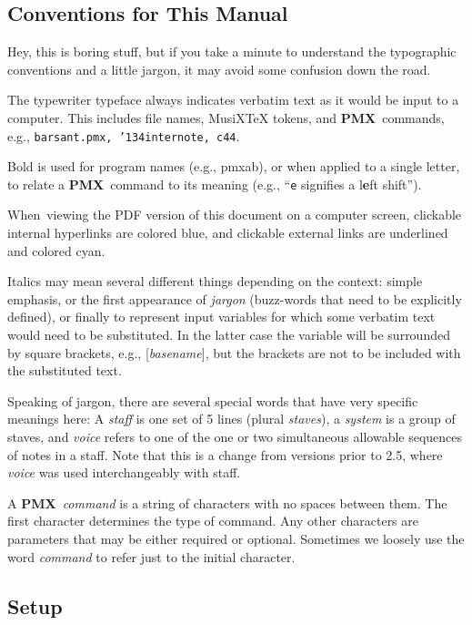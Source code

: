 \documentclass[11pt]{article}
\def\MusiXTeX{MusiX\TeX}
\def\bs{{\tt\char'134}}
\newcommand\PMXX{\textbf{PMX}}
\newcommand\PMX{\PMXX~}
\def\newfrom{2.59}  %
\def\NEW#1{\ifdim#1 pt<\newfrom pt\else%
\marginpar{\fbox{#1}}\fi}
\begin{document}
\subsection{Conventions for This Manual}

	Hey, this is boring stuff, but if you take a minute to understand
the typographic conventions and a little jargon, 
it may avoid some confusion down the road.

	The typewriter typeface always indicates verbatim text as it would
be input to a computer.  This includes file names, \MusiXTeX{} tokens, and 
\PMX commands, e.g., {\tt barsant.pmx, \bs internote, c44}. 

	Bold is used for program names (e.g., {\bfx pmxab}), or when applied
to a single letter, to relate a \PMX command to its meaning (e.g., ``{\tt e}
signifies a l{\bf e}ft shift'').

        When\NEW{2.5}~viewing the PDF version of this document on a computer 
screen, clickable internal hyperlinks are colored blue, and clickable external 
links are underlined and colored cyan. 

        Italics may mean several different things depending on the context:
simple emphasis, or the first appearance of {\it jargon} 
(buzz-words that need to be explicitly defined), or finally  
to represent input variables for which some verbatim text would need to be 
substituted.  In the latter case the variable will be surrounded by
square brackets, e.g., [{\it basename}], but the brackets are not to be 
included with the substituted text.

        Speaking of jargon, there are several special words that have very 
specific meanings here: A {\it staff} is one set of 5 lines (plural 
{\it staves}), a {\it system} is a group of staves, and {\it voice} refers to 
one of the one or two 
simultaneous allowable sequences of notes in a staff. Note that this  
is a change \NEW{2.5}from versions prior to 2.5, where {\it voice} was used 
interchangeably with staff.

A \PMX {\it command} is a string of characters with no spaces between them. 
The first character determines the type of command. Any other characters 
are parameters that may be either required or optional. Sometimes we loosely 
use the word {\it command} to refer just to the initial character. 

\subsection{Setup}
\end{document}
